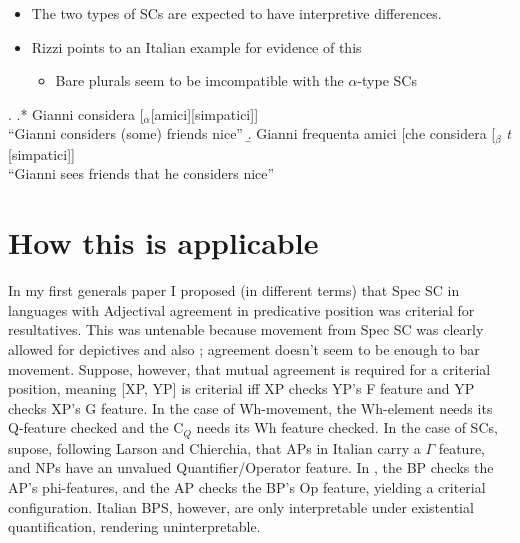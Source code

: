 \documentclass[letterpaper]{article}
\begin{document}
\begin{itemize}
  \item The two types of SCs are expected to have interpretive differences.
  \item Rizzi points to an Italian example for evidence of this
    \begin{itemize}
      \item Bare plurals seem to be imcompatible with the $\alpha$-type SCs
    \end{itemize}
\end{itemize}
\ex.
\a.* Gianni considera [$_\alpha$[amici][simpatici]]\\
``Gianni considers (some) friends nice''
\b. Gianni frequenta amici [che considera [$_\beta$ \textit{t} [simpatici]]\\
``Gianni sees friends that he considers nice''

\section{How this is applicable}
In my first generals paper I proposed (in different terms) that Spec SC in languages with Adjectival agreement in predicative position was criterial for resultatives.
This was untenable because movement from Spec SC was clearly allowed for depictives and also \Last[b]; agreement doesn't seem to be enough to bar movement.
Suppose, however, that mutual agreement is required for a criterial position, meaning [XP, YP] is criterial iff XP checks YP's F feature and YP checks XP's G feature.
In the case of Wh-movement, the Wh-element needs its Q-feature checked and the C$_Q$ needs its Wh feature checked.
In the case of SCs, supose, following Larson and Chierchia, that APs in Italian carry a $\Gamma$ feature, and NPs have an unvalued Quantifier/Operator feature.
In \Last[a], the BP checks the AP's phi-features, and the AP checks the BP's Op feature, yielding a criterial configuration.
Italian BPS, however, are only interpretable under existential quantification, rendering \Last[a] uninterpretable.

\printbibliography
\end{document}
